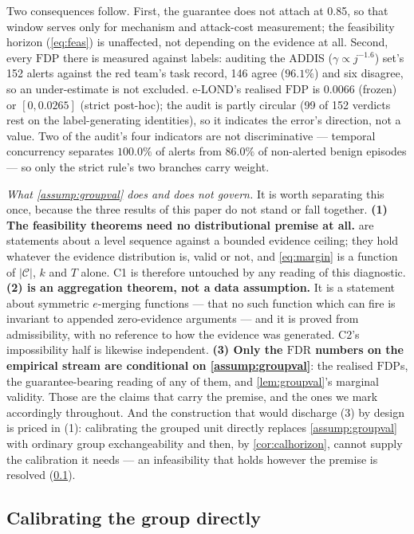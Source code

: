 \documentclass[conference]{IEEEtran}
\newcommand{\Cal}{\mathcal{C}}
\newcommand{\nCal}{\lvert\Cal\rvert}
\newcommand{\FDP}{\mathrm{FDP}}
\newcommand{\FDR}{\mathrm{FDR}}
\begin{document}
Two consequences follow. First, the guarantee does not attach at 0.85, so that window serves only for
mechanism and attack-cost measurement; the feasibility horizon (\cref{eq:feas}) is unaffected, not
depending on the evidence at all. Second, every $\FDP$ there is measured against labels: auditing the
ADDIS ($\gamma\propto j^{-1.6}$) set's 152 alerts against the red team's task record, 146 agree ($96.1\%$) and six
disagree, so an under-estimate is not excluded. e-LOND's realised $\FDP$ is $0.0066$ (frozen) or
$[0,0.0265]$ (strict post-hoc); the audit is partly circular (99 of 152 verdicts rest on the
label-generating identities), so it indicates the error's direction, not a value. Two of the audit's
four indicators are not discriminative --- temporal concurrency separates $100.0\%$ of alerts from
$86.0\%$ of non-alerted benign episodes --- so only the strict rule's two branches carry weight.

\emph{What \cref{assump:groupval} does and does not govern.} It is worth separating this once,
because the three results of this paper do not stand or fall together.
\textbf{(1) The feasibility theorems need no distributional premise at all.}
 are statements about a level sequence against
a bounded evidence ceiling; they hold whatever the evidence distribution is, valid or not, and
\cref{eq:margin} is a function of $\nCal$, $k$ and $T$ alone. C1 is therefore untouched by any reading
of this diagnostic.
\textbf{(2)  is an aggregation theorem, not a data assumption.} It is a statement
about symmetric $e$-merging functions --- that no such function which can fire is invariant to
appended zero-evidence arguments --- and it is proved from admissibility, with no reference to how the
evidence was generated. C2's impossibility half is likewise independent.
\textbf{(3) Only the $\FDR$ numbers on the empirical stream are conditional on \cref{assump:groupval}}:
the realised $\FDP$s, the guarantee-bearing reading of any of them, and \cref{lem:groupval}'s
marginal validity.
Those are the claims that carry the premise, and the ones we mark accordingly throughout.
And the construction that would discharge (3) by design is priced in (1): calibrating the grouped unit
directly replaces \cref{assump:groupval} with ordinary group exchangeability and then, by
\cref{cor:calhorizon}, cannot supply the calibration it needs --- an infeasibility that holds however
the premise is resolved (\cref{sec:groupcal}).

\subsection{Calibrating the group directly}\label{sec:groupcal}
\end{document}
